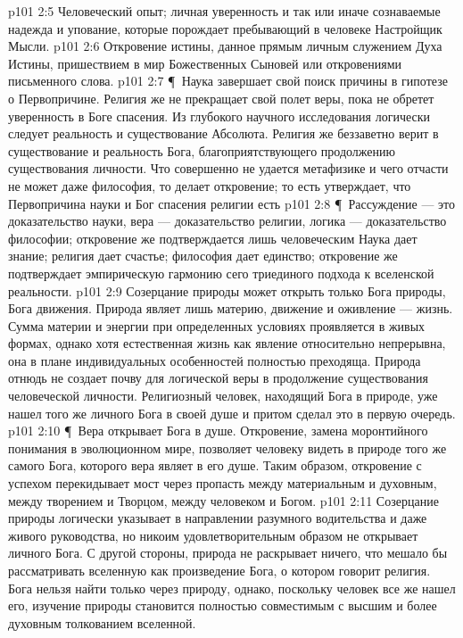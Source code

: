 \vs p101 2:5 \bibnobreakspace Человеческий опыт; личная уверенность и так или иначе сознаваемые надежда и упование, которые порождает пребывающий в человеке Настройщик Мысли.
\vs p101 2:6 \bibnobreakspace Откровение истины, данное прямым личным служением Духа Истины, пришествием в мир Божественных Сыновей или откровениями письменного слова.
\vs p101 2:7 \P\ Наука завершает свой поиск причины в гипотезе о Первопричине. Религия же не прекращает свой полет веры, пока не обретет уверенность в Боге спасения. Из глубокого научного исследования логически следует реальность и существование Абсолюта. Религия же беззаветно верит в существование и реальность Бога, благоприятствующего продолжению существования личности. Что совершенно не удается метафизике и чего отчасти не может даже философия, то делает откровение; то есть утверждает, что Первопричина науки и Бог спасения религии есть 
\vs p101 2:8 \P\ Рассуждение --- это доказательство науки, вера --- доказательство религии, логика --- доказательство философии; откровение же подтверждается лишь человеческим  Наука дает знание; религия дает счастье; философия дает единство; откровение же подтверждает эмпирическую гармонию сего триединого подхода к вселенской реальности.
\vs p101 2:9 Созерцание природы может открыть только Бога природы, Бога движения. Природа являет лишь материю, движение и оживление --- жизнь. Сумма материи и энергии при определенных условиях проявляется в живых формах, однако хотя естественная жизнь как явление относительно непрерывна, она в плане индивидуальных особенностей полностью преходяща. Природа отнюдь не создает почву для логической веры в продолжение существования человеческой личности. Религиозный человек, находящий Бога в природе, уже нашел того же личного Бога в своей душе и притом сделал это в первую очередь.
\vs p101 2:10 \P\ Вера открывает Бога в душе. Откровение, замена моронтийного понимания в эволюционном мире, позволяет человеку видеть в природе того же самого Бога, которого вера являет в его душе. Таким образом, откровение с успехом перекидывает мост через пропасть между материальным и духовным, между творением и Творцом, между человеком и Богом.
\vs p101 2:11 Созерцание природы логически указывает в направлении разумного водительства и даже живого руководства, но никоим удовлетворительным образом не открывает личного Бога. С другой стороны, природа не раскрывает ничего, что мешало бы рассматривать вселенную как произведение Бога, о котором говорит религия. Бога нельзя найти только через природу, однако, поскольку человек все же нашел его, изучение природы становится полностью совместимым с высшим и более духовным толкованием вселенной.
